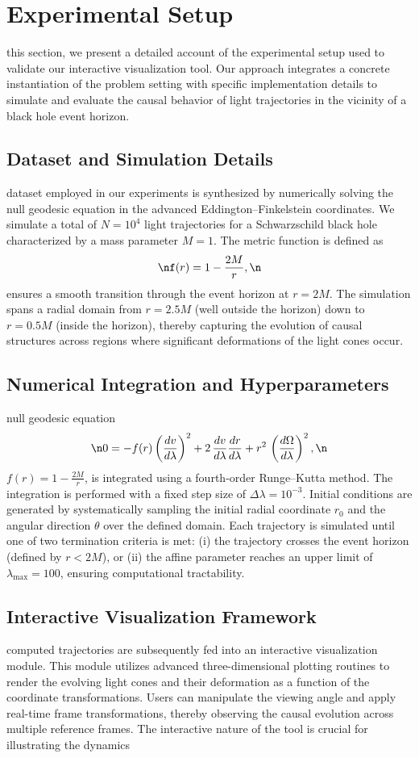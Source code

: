 \documentclass{article}
\begin{document}
\section{Experimental Setup}\nIn this section, we present a detailed account of the experimental setup used to validate our interactive visualization tool. Our approach integrates a concrete instantiation of the problem setting with specific implementation details to simulate and evaluate the causal behavior of light trajectories in the vicinity of a black hole event horizon.\n\n\subsection{Dataset and Simulation Details}\nThe dataset employed in our experiments is synthesized by numerically solving the null geodesic equation in the advanced Eddington--Finkelstein coordinates. We simulate a total of $N=10^4$ light trajectories for a Schwarzschild black hole characterized by a mass parameter $M=1$. The metric function is defined as\n\begin{equation}\nf(r)=1-\frac{2M}{r},\n\end{equation}\nwhich ensures a smooth transition through the event horizon at $r=2M$. The simulation spans a radial domain from $r=2.5M$ (well outside the horizon) down to $r=0.5M$ (inside the horizon), thereby capturing the evolution of causal structures across regions where significant deformations of the light cones occur.\n\n\subsection{Numerical Integration and Hyperparameters}\nThe null geodesic equation\n\begin{equation}\n0 = -f(r)\left(\frac{dv}{d\lambda}\right)^2 + 2\,\frac{dv}{d\lambda}\frac{dr}{d\lambda} + r^2\,\left(\frac{d\Omega}{d\lambda}\right)^2,\n\end{equation}\nwith $f(r)=1-\frac{2M}{r}$, is integrated using a fourth-order Runge--Kutta method. The integration is performed with a fixed step size of $\Delta \lambda=10^{-3}$. Initial conditions are generated by systematically sampling the initial radial coordinate $r_0$ and the angular direction $\theta$ over the defined domain. Each trajectory is simulated until one of two termination criteria is met: (i) the trajectory crosses the event horizon (defined by $r<2M$), or (ii) the affine parameter reaches an upper limit of $\lambda_{\max}=100$, ensuring computational tractability.\n\n\subsection{Interactive Visualization Framework}\nThe computed trajectories are subsequently fed into an interactive visualization module. This module utilizes advanced three-dimensional plotting routines to render the evolving light cones and their deformation as a function of the coordinate transformations. Users can manipulate the viewing angle and apply real-time frame transformations, thereby observing the causal evolution across multiple reference frames. The interactive nature of the tool is crucial for illustrating the dynamics 
\end{document}
